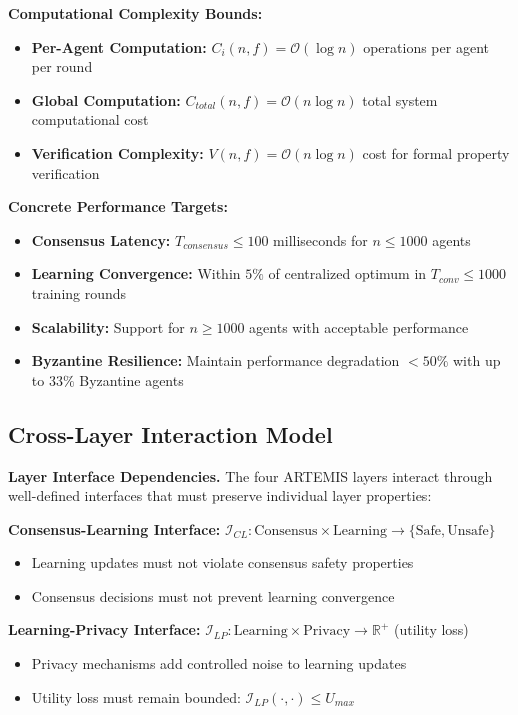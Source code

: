 \documentclass[conference]{IEEEtran}
\newcommand{\bigO}{\mathcal{O}}
\begin{document}
\textbf{Computational Complexity Bounds:}
\begin{itemize}
    \item \textbf{Per-Agent Computation:} $C_i(n, f) = \bigO(\log n)$ operations per agent per round
    \item \textbf{Global Computation:} $C_{total}(n, f) = \bigO(n \log n)$ total system computational cost
    \item \textbf{Verification Complexity:} $V(n, f) = \bigO(n \log n)$ cost for formal property verification
\end{itemize}

\textbf{Concrete Performance Targets:}
\begin{itemize}
    \item \textbf{Consensus Latency:} $T_{consensus} \leq 100$ milliseconds for $n \leq 1000$ agents
    \item \textbf{Learning Convergence:} Within $5\%$ of centralized optimum in $T_{conv} \leq 1000$ training rounds
    \item \textbf{Scalability:} Support for $n \geq 1000$ agents with acceptable performance
    \item \textbf{Byzantine Resilience:} Maintain performance degradation $< 50\%$ with up to $33\%$ Byzantine agents
\end{itemize}

\subsection{Cross-Layer Interaction Model}

\textbf{Layer Interface Dependencies.} The four ARTEMIS layers interact through well-defined interfaces that must preserve individual layer properties:

\textbf{Consensus-Learning Interface:} $\mathcal{I}_{CL}: \text{Consensus} \times \text{Learning} \rightarrow \{\text{Safe}, \text{Unsafe}\}$
\begin{itemize}
    \item Learning updates must not violate consensus safety properties
    \item Consensus decisions must not prevent learning convergence
\end{itemize}

\textbf{Learning-Privacy Interface:} $\mathcal{I}_{LP}: \text{Learning} \times \text{Privacy} \rightarrow \mathbb{R}^+$ (utility loss)
\begin{itemize}
    \item Privacy mechanisms add controlled noise to learning updates
    \item Utility loss must remain bounded: $\mathcal{I}_{LP}(\cdot, \cdot) \leq U_{max}$
\end{itemize}
\end{document}
